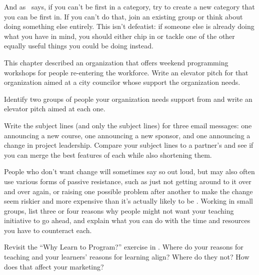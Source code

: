 And as~\cite{Kuch2011} says,
if you can't be first in a category,
try to create a new category that you can be first in.
If you can't do that,
join an existing group or think about doing something else entirely.
This isn't defeatist:
if someone else is already doing what you have in mind,
you should either chip in or tackle one of the other equally useful things
you could be doing instead.



This chapter described an organization
that offers weekend programming workshops for people re-entering the workforce.
Write an elevator pitch for that organization
aimed at a city councilor whose support the organization needs.


Identify two groups of people your organization needs support from
and write an elevator pitch aimed at each one.


Write the subject lines (and only the subject lines) for three email messages:
one announcing a new course,
one announcing a new sponsor,
and one announcing a change in project leadership.
Compare your subject lines to a partner's
and see if you can merge the best features of each while also shortening them.


People who don't want change will sometimes say so out loud,
but may also often use various forms of passive resistance,
such as just not getting around to it over and over again,
or raising one possible problem after another
to make the change seem riskier and more expensive than it's actually likely to be
\cite{Scot1987}.
Working in small groups,
list three or four reasons why people might not want your teaching initiative to go ahead,
and explain what you can do with the time and resources you have to counteract each.


Revisit the ``Why Learn to Program?'' exercise in .
Where do your reasons for teaching and your learners' reasons for learning align?
Where do they not?
How does that affect your marketing?


